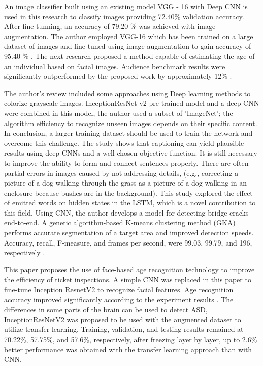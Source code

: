 \documentclass[conference]{IEEEtran}
\begin{document}
An image classifier built using an existing model VGG - 16 with Deep CNN is used in this research to classify images providing 72.40\% validation accuracy. After fine-tunning, an accuracy of 79.20 \% was achieved with image augmentation. The author employed VGG-16 which has been trained on a large dataset of images and fine-tuned using image augmentation to gain accuracy of 95.40 \% \cite{tammina2019transfer}. The next research proposed a method capable of estimating the age of an individual based on facial images. Audience benchmark results were significantly outperformed by the proposed work by approximately 12\% \cite{mallouh2019utilizing}.\

The author’s review included some approaches using Deep learning methods to colorize grayscale images. InceptionResNet-v2 pre-trained model and a deep CNN were combined in this model, the author used a subset of 'ImageNet'; the algorithm efficiency to recognize unseen images depends on their specific content. In conclusion, a larger training dataset should be used to train the network and overcome this challenge\cite{baldassarre2017deep}. The study shows that captioning can yield plausible results using deep CNNs and a well-chosen objective function. It is still necessary to improve the ability to form and connect sentences properly. There are often partial errors in images caused by not addressing details, (e.g., correcting a picture of a dog walking through the grass as a picture of a dog walking in an enclosure because bushes are in the background). This study explored the effect of emitted words on hidden states in the LSTM, which is a novel contribution to this field\cite{bhatia2019image}. Using CNN, the author develops a model for detecting bridge cracks end-to-end. A genetic algorithm-based K-means clustering method (GKA) performs accurate segmentation of a target area and improved detection speeds. Accuracy, recall, F-measure, and frames per second, were 99.03, 99.79, and 196, respectively \cite{wang2021real}.\

This paper proposes the use of face-based age recognition technology to improve the efficiency of ticket inspections. A simple CNN was replaced in this paper to fine-tune Inception ResnetV2 to recognize facial features. Age recognition accuracy improved significantly according to the experiment results \cite{wan2019using}. The differences in some parts of the brain can be used to detect ASD, InceptionResNetV2 was proposed to be used with the augmented dataset to utilize transfer learning. Training, validation, and testing results remained at 70.22\%, 57.75\%, and 57.6\%, respectively, after freezing layer by layer, up to 2.6\% better performance was obtained with the transfer learning approach than with CNN\cite{dominic2021transfer}.\
\end{document}
